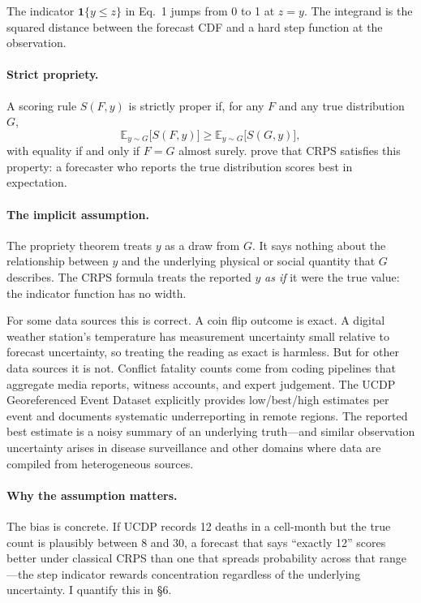 \noindent The indicator $\mathbf{1}\{y \le z\}$ in Eq.~1 jumps from 0 to 1 at $z = y$. The integrand is the squared distance between the forecast CDF and a hard step function at the observation.

\paragraph{Strict propriety.}
A scoring rule $S(F, y)$ is strictly proper if, for any $F$ and any true distribution $G$,
%
\begin{equation}
    \mathbb{E}_{y \sim G}\bigl[ S(F, y) \bigr] \ge \mathbb{E}_{y \sim G}\bigl[ S(G, y) \bigr],
\end{equation}
%
with equality if and only if $F = G$ almost surely. \citet{gneiting2007strictly} prove that CRPS satisfies this property: a forecaster who reports the true distribution scores best in expectation.

\paragraph{The implicit assumption.}
The propriety theorem treats $y$ as a draw from $G$. It says nothing about the relationship between $y$ and the underlying physical or social quantity that $G$ describes. The CRPS formula treats the reported $y$ \emph{as if} it were the true value: the indicator function has no width.

For some data sources this is correct. A coin flip outcome is exact. A digital weather station's temperature has measurement uncertainty small relative to forecast uncertainty, so treating the reading as exact is harmless. But for other data sources it is not. Conflict fatality counts come from coding pipelines that aggregate media reports, witness accounts, and expert judgement. The UCDP Georeferenced Event Dataset \citep{ucdp_codebook} explicitly provides low/best/high estimates per event and documents systematic underreporting in remote regions. The reported best estimate is a noisy summary of an underlying truth---and similar observation uncertainty arises in disease surveillance \citep{gibbons2014measuring} and other domains where data are compiled from heterogeneous sources.

\paragraph{Why the assumption matters.}
The bias is concrete. If UCDP records 12 deaths in a cell-month but the true count is plausibly between 8 and 30, a forecast that says ``exactly 12'' scores better under classical CRPS than one that spreads probability across that range---the step indicator rewards concentration regardless of the underlying uncertainty. I quantify this in \S6.

